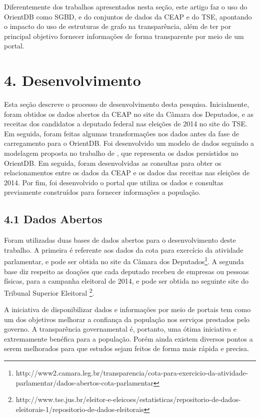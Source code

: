 \documentclass[12pt]{article}
\begin{document}
Diferentemente dos trabalhos apresentados nesta seção, este artigo faz o uso do OrientDB como SGBD, e do conjuntos de dados da CEAP e do TSE, apontando o impacto do uso de estruturas de grafo na transparência, além de ter por principal objetivo fornecer informações de forma transparente por meio de um portal.

\section{4. Desenvolvimento} \label{sec:desenvolvimento}

	Esta seção descreve o processo de desenvolvimento desta pesquisa. Inicialmente, foram obtidos os dados abertos da CEAP no site da Câmara dos Deputados, e as receitas dos candidatos a deputado federal nas eleições de 2014 no site do TSE. Em seguida, foram feitas algumas transformações nos dados antes da fase de carregamento para o OrientDB. Foi desenvolvido um modelo de dados seguindo a modelagem proposta no trabalho de \cite{mdgnosql}, que representa os dados persistidos no OrientDB. Em seguida, foram desenvolvidas as consultas para obter os relacionamentos entre os dados da CEAP e os dados das receitas nas eleições de 2014. Por fim, foi desenvolvido o portal que utiliza os dados e consultas previamente construídos para fornecer informações a população.
	
\subsection{4.1 Dados Abertos} \label{sec:dadosabertos}
	Foram utilizadas duas bases de dados abertos para o desenvolvimento deste trabalho. A primeira é referente aos dados da cota para exercício da atividade parlamentar, e pode ser obtida no site da Câmara dos Deputados\footnote{http://www2.camara.leg.br/transparencia/cota-para-exercicio-da-atividade-parlamentar/dados-abertos-cota-parlamentar}. A segunda base diz respeito as doações que cada deputado recebeu de empresas ou pessoas físicas, para a campanha eleitoral de 2014, e pode ser obtida no seguinte site do Tribunal Superior Eleitoral \footnote{http://www.tse.jus.br/eleitor-e-eleicoes/estatisticas/repositorio-de-dados-eleitorais-1/repositorio-de-dados-eleitorais}.
	
	A iniciativa de disponibilizar dados e informações por meio de portais tem como um dos objetivos melhorar a confiança da população nos serviços prestados pelo governo. A transparência governamental é, portanto, uma ótima iniciativa e extremamente benéfica para a população. Porém ainda existem diversos pontos a serem melhorados para que estudos sejam feitos de forma mais rápida e precisa.
	
\end{document}
